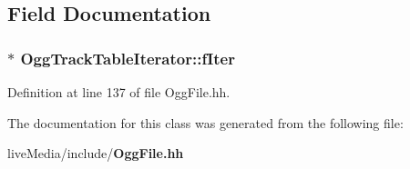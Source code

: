 \subsection{Field Documentation}
\subsubsection[{f\+Iter}]{$\ast$ Ogg\+Track\+Table\+Iterator\+::f\+Iter\hspace{0.3cm}{\ttfamily [private]}}\label{classOggTrackTableIterator_a9542d1d1ef8d25ef9ff21d0e50ce852f}


Definition at line 137 of file Ogg\+File.\+hh.



The documentation for this class was generated from the following file\+:\begin{DoxyCompactItemize}
\item 
live\+Media/include/{\bf Ogg\+File.\+hh}\end{DoxyCompactItemize}
